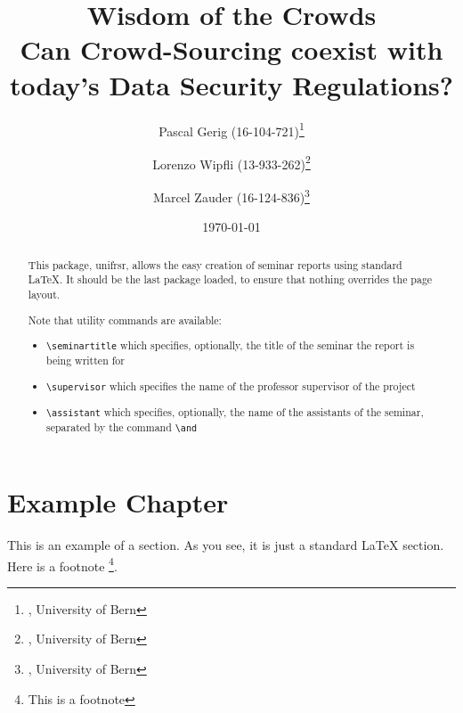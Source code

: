 \documentclass[a4paper,12pt]{report}
\begin{document}

	\title{Wisdom of the Crowds \\ Can Crowd-Sourcing coexist with today’s Data Security Regulations?} %

	\author{Pascal Gerig (16-104-721)\thanks{, University of Bern}
   		\and Lorenzo Wipfli  (13-933-262)\thanks{, University of Bern}
   		\and Marcel Zauder  (16-124-836)\thanks{, University of Bern}
   	}	%



	\date{\today} %

	\maketitle

	\begin{abstract}
		This package, \textsf{unifrsr}, allows the easy creation of seminar
		reports using standard \LaTeX. It should be the last
		package loaded, to ensure that nothing overrides the page layout.

		Note that utility commands are available: 
		\begin{itemize}
			\item \verb+\seminartitle+ which specifies, optionally, the title of the seminar the report is being written for
			\item \verb+\supervisor+ which specifies the name of the professor supervisor of the project
			\item \verb+\assistant+ which specifies, optionally, the name of the assistants of the seminar, separated by the command \verb+\and+
		\end{itemize}

	\end{abstract}

	\tableofcontents

	\chapter{Example Chapter}
		This is an example of a section. As you see, it is just a standard {\LaTeX} section. Here is a footnote%
		\footnote{This is a footnote}.
\end{document}
